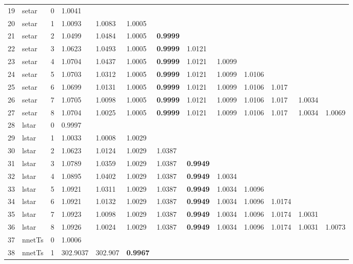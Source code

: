 \documentclass[10pt,a4paper]{article}
\begin{document}
\begin{table}[ht]
\begin{tabular}{rlrllllllllll}
   \hline
19 & setar &     0 & 1.0041 &  &  &  &  &  &  &  &  &  \\ 
  20 & setar &     1 & 1.0093 & 1.0083 & 1.0005 &  &  &  &  &  &  &  \\ 
  21 & setar &     2 & 1.0499 & 1.0484 & 1.0005 & \textbf{0.9999} &  &  &  &  &  &  \\ 
  22 & setar &     3 & 1.0623 & 1.0493 & 1.0005 & \textbf{0.9999} & 1.0121 &  &  &  &  &  \\ 
  23 & setar &     4 & 1.0704 & 1.0437 & 1.0005 & \textbf{0.9999} & 1.0121 & 1.0099 &  &  &  &  \\ 
  24 & setar &     5 & 1.0703 & 1.0312 & 1.0005 & \textbf{0.9999} & 1.0121 & 1.0099 & 1.0106 &  &  &  \\ 
  25 & setar &     6 & 1.0699 & 1.0131 & 1.0005 & \textbf{0.9999} & 1.0121 & 1.0099 & 1.0106 & 1.017 &  &  \\ 
  26 & setar &     7 & 1.0705 & 1.0098 & 1.0005 & \textbf{0.9999} & 1.0121 & 1.0099 & 1.0106 & 1.017 & 1.0034 &  \\ 
  27 & setar &     8 & 1.0704 & 1.0025 & 1.0005 & \textbf{0.9999} & 1.0121 & 1.0099 & 1.0106 & 1.017 & 1.0034 & 1.0069 \\ 
   \hline
28 & lstar &     0 & 0.9997 &  &  &  &  &  &  &  &  &  \\ 
  29 & lstar &     1 & 1.0033 & 1.0008 & 1.0029 &  &  &  &  &  &  &  \\ 
  30 & lstar &     2 & 1.0623 & 1.0124 & 1.0029 & 1.0387 &  &  &  &  &  &  \\ 
  31 & lstar &     3 & 1.0789 & 1.0359 & 1.0029 & 1.0387 & \textbf{0.9949} &  &  &  &  &  \\ 
  32 & lstar &     4 & 1.0895 & 1.0402 & 1.0029 & 1.0387 & \textbf{0.9949} & 1.0034 &  &  &  &  \\ 
  33 & lstar &     5 & 1.0921 & 1.0311 & 1.0029 & 1.0387 & \textbf{0.9949} & 1.0034 & 1.0096 &  &  &  \\ 
  34 & lstar &     6 & 1.0921 & 1.0132 & 1.0029 & 1.0387 & \textbf{0.9949} & 1.0034 & 1.0096 & 1.0174 &  &  \\ 
  35 & lstar &     7 & 1.0923 & 1.0098 & 1.0029 & 1.0387 & \textbf{0.9949} & 1.0034 & 1.0096 & 1.0174 & 1.0031 &  \\ 
  36 & lstar &     8 & 1.0926 & 1.0024 & 1.0029 & 1.0387 & \textbf{0.9949} & 1.0034 & 1.0096 & 1.0174 & 1.0031 & 1.0073 \\ 
   \hline
37 & nnetTs &     0 & 1.0006 &  &  &  &  &  &  &  &  &  \\ 
  38 & nnetTs &     1 & 302.9037 & 302.907 & \textbf{0.9967} &  &  &  &  &  &  &  \\ 

\end{tabular}
\end{table}
\end{document}
